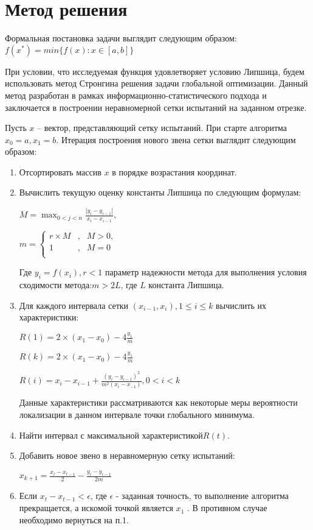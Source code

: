 \documentclass{report}
\begin{document}
\section*{Метод решения}
Формальная постановка задачи выглядит следующим образом:
$f({x}^{\ast}) = min \{f(x):x \in [a,b]\}$
\par При условии, что исследуемая функция удовлетворяет условию Липшица, будем использовать метод Стронгина решения задачи глобальной оптимизации. Данный метод разработан в рамках информационно-статистического подхода и заключается в построении неравномерной сетки испытаний на заданном отрезке.
\par Пусть $x$ – вектор, представляющий сетку испытаний. При старте алгоритма $x_0 = a, x_1 = b$. Итерация построения нового звена сетки выглядит следующим образом:
\begin{enumerate}
	\item Отсортировать массив $x$ в порядке возрастания координат.
	\item Вычислить текущую оценку константы Липшица по следующим формулам: \par
	$M = \max_{0<j<n}\frac{|y_i - y_{i-1} |}{x_i - x_{i-1}},$\par
	$
	m =\left\{
	\begin{array}{rcl}
		r \times{} M&,&M > 0,\\
		1& , &M = 0\\
	\end{array}
	\right.
	$ \par
	Где $y_i = f(x_i), r < 1$ параметр надежности метода для выполнения условия сходимости метода:$m > 2L$, где $L$ константа Липшица.
	\item Для каждого интервала сетки $(x_{i-1},x_i), 1 \leq i \leq k$ вычислить их характеристики: \par
	$R(1) = 2\times{}(x_1 - x_0) - 4\frac{y_1}{m}$ \par
	$R(k) = 2\times{}(x_1 - x_0) - 4\frac{y_1}{m}$ \par
	$R(i) = x_i - x_{i-1} + \frac{({y_i - y_{i-1}})^2}{m^2(x_i-x_{-1})}, 0 < i < k$ \par
	Данные характеристики рассматриваются как некоторые меры вероятности локализации в данном интервале точки глобального минимума.
	\item Найти интервал с максимальной характеристикой$R(t)$.
	\item Добавить новое звено в неравномерную сетку испытаний:\par
	$x_{k+1} = \frac{x_t - x_{t -1}}{2} - \frac{y_i - y_{i - 1}}{2m}$
	\item Если $x_t - x_{t -1} < \epsilon$, где  $\epsilon$ - заданная точность, то выполнение алгоритма прекращается, а искомой точкой является $x_1$ . В противном случае необходимо вернуться на п.1.
\end{enumerate}
\newpage
\end{document}
